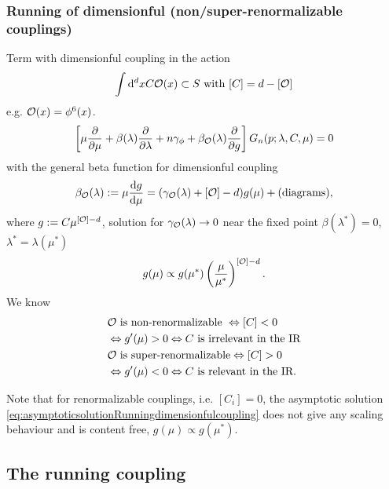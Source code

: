 \subsubsection{Running of dimensionful (non/super-renormalizable couplings)}
\begin{mybox}{}
	Term with dimensionful coupling in the action
	\begin{equation}
		\int \mathrm{d}^d x C \mathcal{O}(x) \subset S \text{ with } [C] = d- [\mathcal{O}]
	\end{equation}
	e.g. $\mathcal{O}(x) = \phi^6(x)$.
	\begin{equation}
		\left[\mu \frac{\partial}{\partial \mu} + \beta(\lambda) \frac{\partial}{\partial \lambda} + n \gamma_{\phi} + \beta_{\mathcal{O}}(\lambda) \frac{\partial}{\partial g}\right]G_n(p;\lambda,C,\mu) =0
	\end{equation}
	with the general beta function for dimensionful coupling 
	\begin{equation}
		\beta_{\mathcal{O}}(\lambda) := \mu \frac{\mathrm{d} g}{\mathrm{d} \mu} = (\gamma_{\mathcal{O}}(\lambda) + [\mathcal{O}] - d ) g(\mu) + (\text{diagrams}),
	\end{equation}
	where $g:=C\mu^{[\mathcal{O}]-d}$, solution for $\gamma_{\mathcal{O}}(\lambda)\rightarrow 0$ near the fixed point $\beta(\lambda^*)=0$,$\lambda^*=\lambda(\mu^*)$
	\begin{equation}
	\label{eq:asymptoticsolutionRunningdimensionfulcoupling}
		g(\mu) \propto g(\mu^*) \left(\frac{\mu}{\mu^*}\right)^{[\mathcal{O}]-d}.
	\end{equation}
	We know
	\begin{align}
		&\mathcal{O} \text{ is non-renormalizable } \Leftrightarrow [C]<0 \nonumber\\
		&\Leftrightarrow g^\prime(\mu) >0 \Leftrightarrow C \text{ is irrelevant in the IR}\\
		&\mathcal{O} \text{ is super-renormalizable} \Leftrightarrow [C] >0 \nonumber \\
		&\Leftrightarrow g^\prime(\mu) <0 \Leftrightarrow C \text{ is relevant in the IR}.
	\end{align}
	
	
\end{mybox}
Note that for renormalizable couplings, i.e. $[C_i]=0$, the asymptotic solution \ref{eq:asymptoticsolutionRunningdimensionfulcoupling} does not give any scaling behaviour and is content free, $g(\mu) \propto g(\mu^*)$.

\subsection{The running coupling}
